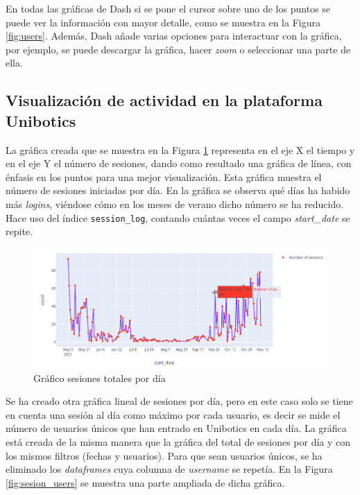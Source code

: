 En todas las gráficas de Dash si se pone el cursor sobre uno de los puntos se puede ver la información con mayor detalle, como se muestra en la Figura \ref{fig:users}. Además, Dash añade varias opciones para interactuar con la gráfica, por ejemplo, se puede descargar la gráfica, hacer \textit{zoom} o seleccionar una parte de ella. \\
\subsection{Visualización de actividad en la plataforma Unibotics}

La gráfica creada que se muestra en la Figura \ref{fig:sesion} representa en el eje X el tiempo y en el eje Y el número de sesiones, dando como resultado una gráfica de línea, con énfasis en los puntos para una mejor visualización. Esta gráfica muestra el número de sesiones iniciadas por día. En la gráfica se observa qué días ha habido más \textit{logins}, viéndose cómo en los meses de verano dicho número se ha reducido. Hace uso del índice \texttt{session\_log}, contando cuántas veces el campo \textit{start\_date} se repite.\\



\begin{figure}[H]
    \centering
    \includegraphics[width=16cm, keepaspectratio]{img/sesion.png}
    \caption{Gráfico sesiones totales por día}
    \label{fig:sesion}
\end{figure}
Se ha creado otra gráfica lineal de sesiones por día, pero en este caso solo se tiene en cuenta una sesión al día como máximo por cada usuario, es decir se mide el número de usuarios únicos que han entrado en Unibotics en cada día. La gráfica está creada de la misma manera que la gráfica del total de sesiones por día y con los mismos filtros (fechas y usuarios). Para que sean usuarios únicos, se ha eliminado los\textit{ dataframes} cuya columna de \textit{username} se repetía. En la Figura \ref{fig:sesion_users}  se muestra una parte ampliada de dicha gráfica.\\

